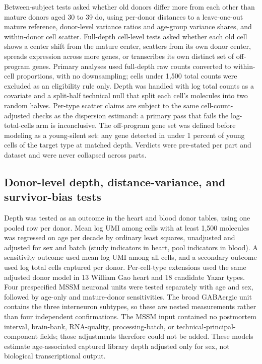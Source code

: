 \documentclass[11pt]{article}
\begin{document}
Between-subject tests asked whether old donors differ more from each other than mature donors aged 30 to 39 do, using per-donor distances to a leave-one-out mature reference, donor-level variance ratios and age-group variance shares, and within-donor cell scatter. Full-depth cell-level tests asked whether each old cell shows a center shift from the mature center, scatters from its own donor center, spreads expression across more genes, or transcribes its own distinct set of off-program genes. Primary analyses used full-depth raw counts converted to within-cell proportions, with no downsampling; cells under 1,500 total counts were excluded as an eligibility rule only. Depth was handled with log total counts as a covariate and a split-half technical null that split each cell's molecules into two random halves. Per-type scatter claims are subject to the same cell-count-adjusted checks as the dispersion estimand: a primary pass that fails the log-total-cells arm is inconclusive. The off-program gene set was defined before modeling as a young-silent set: any gene detected in under 1 percent of young cells of the target type at matched depth. Verdicts were pre-stated per part and dataset and were never collapsed across parts.

\subsection*{Donor-level depth, distance-variance, and survivor-bias tests}

Depth was tested as an outcome in the heart and blood donor tables, using one pooled row per donor. Mean log UMI among cells with at least 1,500 molecules was regressed on age per decade by ordinary least squares, unadjusted and adjusted for sex and batch (study indicators in heart, pool indicators in blood). A sensitivity outcome used mean log UMI among all cells, and a secondary outcome used log total cells captured per donor. Per-cell-type extensions used the same adjusted donor model in 13 William Gao heart and 18 candidate Yazar types. Four prespecified MSSM neuronal units were tested separately with age and sex, followed by age-only and mature-donor sensitivities. The broad GABAergic unit contains the three interneuron subtypes, so these are nested measurements rather than four independent confirmations. The MSSM input contained no postmortem interval, brain-bank, RNA-quality, processing-batch, or technical-principal-component fields; those adjustments therefore could not be added. These models estimate age-associated captured library depth adjusted only for sex, not biological transcriptional output.
\end{document}

